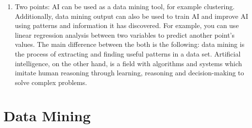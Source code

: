 \documentclass[a4paper, 12pt]{article}
\theoremstyle{plain}
\theoremstyle{definition}
\theoremstyle{remark}
\begin{document}
\begin{enumerate}
	\item Two points: AI can be used as a data mining tool, for example clustering. Additionally, data mining output can also be used to train AI and improve AI using patterns and information it has discovered. For example, you can use linear regression analysis between two variables to predict another point's values. The main difference between the both is the following: data mining is the process of extracting and finding useful patterns in a data set. Artificial intelligence, on the other hand, is a field with algorithms and systems which imitate human reasoning through learning, reasoning and decision-making to solve complex problems.
\end{enumerate}
\newpage
\section{Data Mining}
\end{document}
